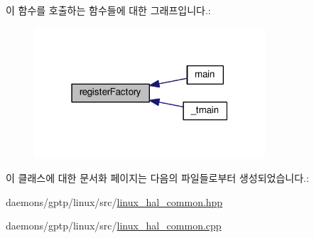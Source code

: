 이 함수를 호출하는 함수들에 대한 그래프입니다.\+:
\nopagebreak
\begin{figure}[H]
\begin{center}
\leavevmode
\includegraphics[width=244pt]{class_o_s_network_interface_factory_a31c35b66fcf0061135c152be8e602acd_icgraph}
\end{center}
\end{figure}




이 클래스에 대한 문서화 페이지는 다음의 파일들로부터 생성되었습니다.\+:\begin{DoxyCompactItemize}
\item 
daemons/gptp/linux/src/\hyperlink{linux__hal__common_8hpp}{linux\+\_\+hal\+\_\+common.\+hpp}\item 
daemons/gptp/linux/src/\hyperlink{linux__hal__common_8cpp}{linux\+\_\+hal\+\_\+common.\+cpp}\end{DoxyCompactItemize}
